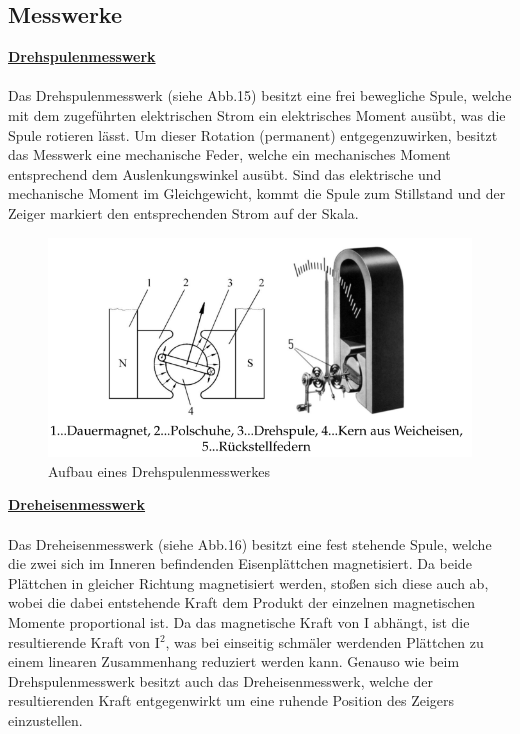 \documentclass[a4paper,12pt]{article}
\begin{document}
	\subsection{Messwerke}
	\underline{\textbf{Drehspulenmesswerk}} \\ \\
	Das Drehspulenmesswerk (siehe Abb.15) besitzt eine frei bewegliche Spule, welche mit dem zugeführten elektrischen Strom ein elektrisches Moment ausübt, was die Spule rotieren lässt. Um dieser Rotation (permanent) entgegenzuwirken, besitzt das Messwerk eine mechanische Feder, welche ein mechanisches Moment entsprechend dem Auslenkungswinkel ausübt. Sind das elektrische und mechanische Moment im Gleichgewicht, kommt die Spule zum Stillstand und der Zeiger markiert den entsprechenden Strom auf der Skala.
	\begin{figure}[h]
		\centering
		\includegraphics[width=15cm]{img/Drehspulenmesswerk}
		\caption{Aufbau eines Drehspulenmesswerkes}
	\end{figure}
	\newpage
	\noindent
	\underline{\textbf{Dreheisenmesswerk}} \\ \\
	Das Dreheisenmesswerk (siehe Abb.16) besitzt eine fest stehende Spule, welche die zwei sich im Inneren befindenden Eisenplättchen magnetisiert. Da beide Plättchen in gleicher Richtung magnetisiert werden, stoßen sich diese auch ab, wobei die dabei entstehende Kraft dem Produkt der einzelnen magnetischen Momente proportional ist. Da das magnetische Kraft von I abhängt, ist die resultierende Kraft von I$^2$, was bei einseitig schmäler werdenden Plättchen zu einem linearen Zusammenhang reduziert werden kann. Genauso wie beim Drehspulenmesswerk besitzt auch das Dreheisenmesswerk, welche der resultierenden Kraft entgegenwirkt um eine ruhende Position des Zeigers einzustellen.
\end{document}

